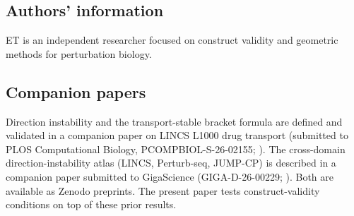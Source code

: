 \documentclass[11pt]{article}
\begin{document}
\subsection*{Authors' information}
ET is an independent researcher focused on construct validity
and geometric methods for perturbation biology.

\subsection*{Companion papers}
Direction instability and the transport-stable bracket formula are
defined and validated in a companion paper on LINCS L1000 drug
transport (submitted to PLOS Computational Biology,
PCOMPBIOL-S-26-02155; \citep{tower2026drug}). The cross-domain
direction-instability atlas (LINCS, Perturb-seq, JUMP-CP) is
described in a companion paper submitted to GigaScience
(GIGA-D-26-00229; \citep{tower2026atlas}). Both are available as
Zenodo preprints. The present paper tests construct-validity
conditions on top of these prior results.



\end{document}
